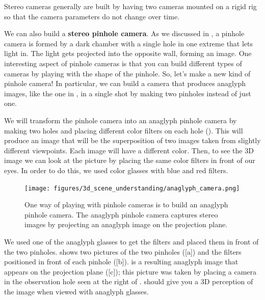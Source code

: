 Stereo cameras generally are built by having two cameras mounted on a rigid rig so that the camera parameters do not change over time.

We can also build a {\bf stereo pinhole camera}.
As we discussed in \chap{\ref{chapter:imaging}}, a pinhole camera is formed by a dark chamber with a single hole in one extreme that lets light in. The light gets projected into the opposite wall, forming an image. One interesting aspect of pinhole cameras is that you can build different types of cameras by playing with the shape of the pinhole. So, let's make a new kind of pinhole camera! In particular, we can build a camera that produces anaglyph images, like the one in \fig{\ref{fig:titanic}}, in a single shot by making two pinholes instead of just one.

We will transform the pinhole camera into an anaglyph pinhole camera by making two holes and placing different color filters on each hole (\fig{\ref{fig:anaglyph}}). This will produce an image that will be the superposition of two images taken from slightly different viewpoints. Each image will have a different color. Then, to see the 3D image we can look at the picture by placing the same color filters in front of our eyes. In order to do this, we used color glasses with blue and red filters.

\begin{figure}
    \centerline{
        \texttt{[image: figures/3d\_scene\_understanding/anaglyph\_camera.png]}
    }
    \caption{One way of playing with pinhole cameras is to build an anaglyph pinhole camera. The anaglyph pinhole camera captures stereo images by projecting an anaglyph image on the projection plane.}
    \label{fig:anaglyph}
\end{figure}

We used one of the anaglyph glasses to get the filters and placed them in front of the two pinholes. \Fig{\ref{fig:anaglyph}} shows two pictures of the two pinholes (\fig{\ref{fig:anaglyph}}[a]) and the filters positioned in front of each pinhole (\fig{\ref{fig:anaglyph}}[b]).  is a resulting anaglyph image that appears on the projection plane
(\fig{\ref{fig:anaglyph}}[c]); this picture was taken by placing a camera in the observation hole seen at the right of .  should give you a 3D perception of the image when viewed with anaglyph glasses.

